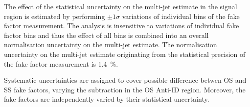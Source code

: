 The effect of the statistical uncertainty on the multi-jet estimate in
the signal region is estimated by performing $\pm 1 \sigma$ variations
of individual bins of the fake factor measurement. The analysis is
insensitive to variations of individual fake factor bins and thus the
effect of all bins is combined into an overall normalisation
uncertainty on the multi-jet estimate. The normalisation uncertainty
on the multi-jet estimate originating from the statistical precision
of the fake factor measurement is \SI{1.4}{\percent}.


%




Systematic uncertainties are assigned to cover possible difference
betwen OS and SS fake factors, varying the subtraction in the OS
Anti-ID region. Moreover, the fake factors are independently varied by
their statistical uncertainty.



